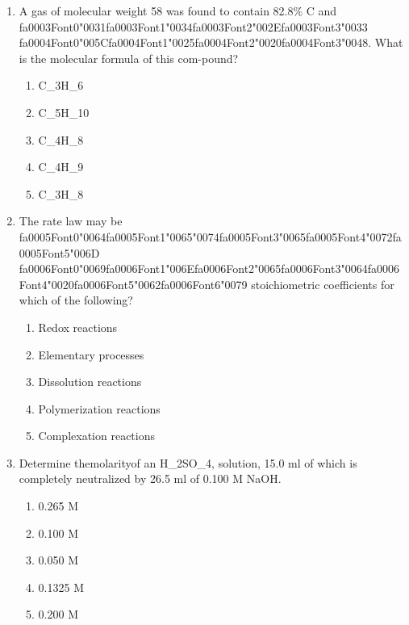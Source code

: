 \documentclass[12pt]{article}
\begin{document}
\begin{enumerate}[label=\arabic*.]
\begin{enumerate}[label=(\alph*)]
    \item The atomic radius of hydrogen is one tenth the first Bohr radius
    \item The atomic radius of hydrogen is larger than the first Bohr radius
\end{enumerate}
\item A gas of molecular weight 58 was found to contain 82.8\% C and {\csname fa0003Font0\endcsname\char"0031}{\csname fa0003Font1\endcsname\char"0034}{\csname fa0003Font2\endcsname\char"002E}{\csname fa0003Font3\endcsname\char"0033} {\csname fa0004Font0\endcsname\char"005C}{\csname fa0004Font1\endcsname\char"0025}{\csname fa0004Font2\endcsname\char"0020}{\csname fa0004Font3\endcsname\char"0048}. What is the
molecular formula of this com-pound?
\begin{enumerate}[label=(\alph*)]
    \item C\_3H\_6
    \item C\_5H\_10
    \item C\_4H\_8
    \item C\_4H\_9
    \item C\_3H\_8
\end{enumerate}
\item The rate law may be {\csname fa0005Font0\endcsname\char"0064}{\csname fa0005Font1\endcsname\char"0065}{\char"0074}{\csname fa0005Font3\endcsname\char"0065}{\csname fa0005Font4\endcsname\char"0072}{\csname fa0005Font5\endcsname\char"006D} {\csname fa0006Font0\endcsname\char"0069}{\csname fa0006Font1\endcsname\char"006E}{\csname fa0006Font2\endcsname\char"0065}{\csname fa0006Font3\endcsname\char"0064}{\csname fa0006Font4\endcsname\char"0020}{\csname fa0006Font5\endcsname\char"0062}{\csname fa0006Font6\endcsname\char"0079} stoichiometric coefficients for which of the following?
\begin{enumerate}[label=(\alph*)]
    \item Redox reactions
    \item Elementary processes
    \item Dissolution reactions
    \item Polymerization reactions
    \item Complexation reactions
\end{enumerate}
\item Determine themolarityof an H\_2SO\_4, solution, 15.0 ml of which is completely neutralized
by 26.5 ml of 0.100 M NaOH.
\begin{enumerate}[label=(\alph*)]
    \item 0.265 M
    \item 0.100 M
    \item 0.050 M
    \item 0.1325 M
    \item 0.200 M
\end{enumerate}
\end{enumerate}
\end{document}
